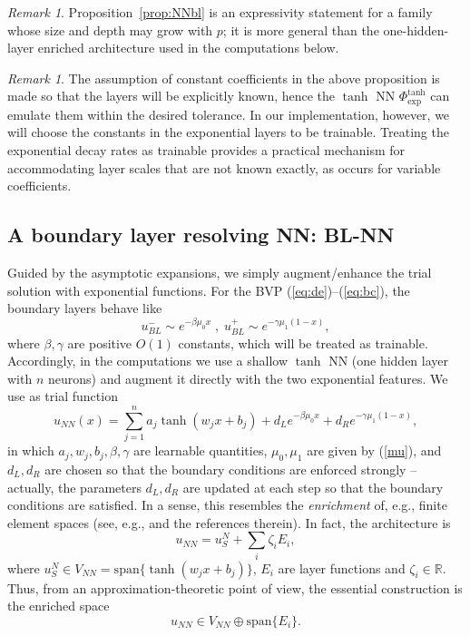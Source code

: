 \documentclass[11pt]{article}
\theoremstyle{plain}
\theoremstyle{definition}
\theoremstyle{remark}
\newtheorem{remark}[theorem]{Remark}
\numberwithin{equation}{section}
\begin{document}
\begin{remark}
Proposition~\ref{prop:NNbl} is an expressivity statement for a family whose size and depth may grow with $p$; it is more general than the one-hidden-layer enriched architecture used in the computations below.
\end{remark}

\begin{remark}
The assumption of constant coefficients in the above proposition is made so that the layers will be explicitly known,  hence the $\tanh$ NN $\Phi^{\tanh}_{\text{exp}}$ can emulate them within the desired tolerance. In our implementation, however, we will choose the constants in the exponential layers to be trainable. Treating the exponential decay rates as trainable provides a practical mechanism for accommodating layer scales that are not known exactly, as occurs for variable coefficients.
\end{remark}


\subsection{A boundary layer resolving NN: BL-NN}
\label{sec:BLNN}
Guided by the asymptotic expansions, we simply augment/enhance the trial solution with exponential functions. For the BVP (\ref{eq:de})--(\ref{eq:bc}), the boundary layers behave like
$$
u_{BL}^{-} \sim e^{-\beta \mu_0 x} \; , \; u_{BL}^{+} \sim e^{-\gamma \mu_1 (1-x)},
$$
where $\beta, \gamma$ are positive $O(1)$ constants, which will be treated as trainable. Accordingly, in the computations we use a shallow $\tanh$ NN (one hidden layer with $n$ neurons) and augment it directly with the two exponential features. We use as trial function
%
\begin{equation}\label{uNN}
u_{NN}(x)= \sum_{j=1}^n a_j \tanh \left(w_j x+b_j\right)+d_L e^{-\beta \mu_0 x} +d_R e^{-\gamma \mu_1 (1-x)},
\end{equation}
in which $a_j, w_j , b_j, \beta, \gamma$ are learnable quantities, $\mu_0, \mu_1$ are given by (\ref{mu}), and $d_L, d_R$ are chosen so that the boundary conditions are enforced strongly -- actually, the parameters $d_L, d_R$ are updated at each step so that the boundary conditions are satisfied. In a sense, this resembles the \emph{enrichment} of, e.g., finite element spaces (see, e.g., \cite{Kellogg} and the references therein). In fact, the architecture is
%
$$
u_{NN} = u^N_S + \sum_i \zeta_i E_i,
$$
%
where $u^N_S \in V_{NN} = \text{span} \{ \tanh(w_j x + b_j)\}$, $E_i$ are layer functions and $\zeta_i \in \mathbb{R}$. Thus, from an approximation-theoretic point of view, the essential construction is the enriched space
%
$$
u_{NN} \in V_{NN} \oplus \text{span}\{ E_i \}.
$$
\end{document}
